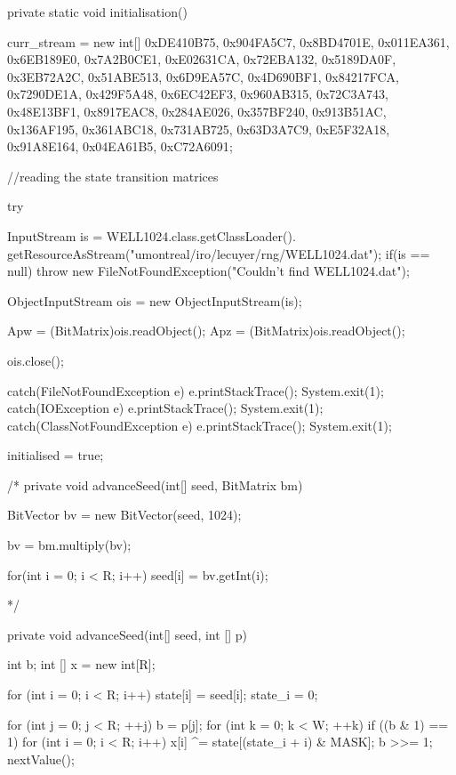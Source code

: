 \begin{code}
\begin{hide}
{   private static void initialisation() {

      curr_stream = new int[] {0xDE410B75, 0x904FA5C7, 0x8BD4701E, 0x011EA361,
                               0x6EB189E0, 0x7A2B0CE1, 0xE02631CA, 0x72EBA132,
                               0x5189DA0F, 0x3EB72A2C, 0x51ABE513, 0x6D9EA57C,
                               0x4D690BF1, 0x84217FCA, 0x7290DE1A, 0x429F5A48,
                               0x6EC42EF3, 0x960AB315, 0x72C3A743, 0x48E13BF1,
                               0x8917EAC8, 0x284AE026, 0x357BF240, 0x913B51AC,
                               0x136AF195, 0x361ABC18, 0x731AB725, 0x63D3A7C9,
                               0xE5F32A18, 0x91A8E164, 0x04EA61B5, 0xC72A6091};

      //reading the state transition matrices

      try {
         InputStream is = WELL1024.class.getClassLoader().
                          getResourceAsStream("umontreal/iro/lecuyer/rng/WELL1024.dat");
         if(is == null)
            throw new FileNotFoundException("Couldn't find WELL1024.dat");

         ObjectInputStream ois = new ObjectInputStream(is);

         Apw = (BitMatrix)ois.readObject();
         Apz = (BitMatrix)ois.readObject();

         ois.close();
      } catch(FileNotFoundException e) {
         e.printStackTrace();
         System.exit(1);
      } catch(IOException e) {
         e.printStackTrace();
         System.exit(1);
      } catch(ClassNotFoundException e) {
         e.printStackTrace();
         System.exit(1);
      }

      initialised = true;
   }

/*
   private void advanceSeed(int[] seed, BitMatrix bm) {
      BitVector bv = new BitVector(seed, 1024);

      bv = bm.multiply(bv);

      for(int i = 0; i < R; i++)
         seed[i] = bv.getInt(i);
   }
*/

   private void advanceSeed(int[] seed, int [] p) {
      int b;
      int [] x = new int[R];

      for (int i = 0; i < R; i++) {
         state[i] = seed[i];
      }
      state_i = 0;

      for (int j = 0; j < R; ++j) {
         b = p[j];
         for (int k = 0; k < W; ++k) {
            if ((b & 1) == 1) {
               for (int i = 0; i < R; i++) {
                  x[i] ^= state[(state_i + i) & MASK];
               }
            }
            b >>= 1;
            nextValue();
         }
      }

}}
\end{hide}
\end{code}

